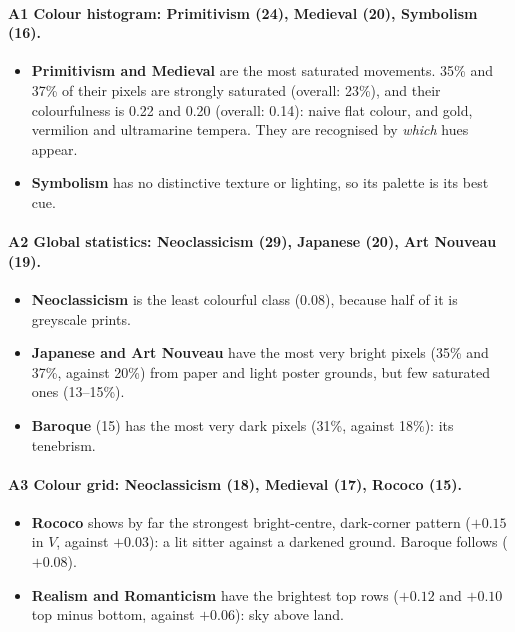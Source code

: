 \documentclass[10pt,twocolumn,a4paper]{article}
\begin{document}
\paragraph{A1 Colour histogram: Primitivism (24), Medieval (20), Symbolism (16).}
\begin{itemize}
\item \textbf{Primitivism and Medieval} are the most saturated movements. 35\% and 37\% of their pixels are strongly saturated (overall: 23\%), and their colourfulness is 0.22 and 0.20 (overall: 0.14): naive flat colour, and gold, vermilion and ultramarine tempera. They are recognised by \emph{which} hues appear.
\item \textbf{Symbolism} has no distinctive texture or lighting, so its palette is its best cue.
\end{itemize}

\paragraph{A2 Global statistics: Neoclassicism (29), Japanese (20), Art Nouveau (19).}
\begin{itemize}
\item \textbf{Neoclassicism} is the least colourful class (0.08), because half of it is greyscale prints.
\item \textbf{Japanese and Art Nouveau} have the most very bright pixels (35\% and 37\%, against 20\%) from paper and light poster grounds, but few saturated ones (13--15\%).
\item \textbf{Baroque} (15) has the most very dark pixels (31\%, against 18\%): its tenebrism.
\end{itemize}

\paragraph{A3 Colour grid: Neoclassicism (18), Medieval (17), Rococo (15).}
\begin{itemize}
\item \textbf{Rococo} shows by far the strongest bright-centre, dark-corner pattern ($+0.15$ in $V$, against $+0.03$): a lit sitter against a darkened ground. Baroque follows ($+0.08$).
\item \textbf{Realism and Romanticism} have the brightest top rows ($+0.12$ and $+0.10$ top minus bottom, against $+0.06$): sky above land.
\end{itemize}
\end{document}
